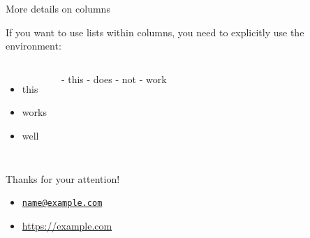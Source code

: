 \documentclass[10pt,aspectratio=169,]{beamer}
\begin{document}
\begin{frame}{More details on columns}
\label{more-details-on-columns}
\hypertarget{backup_column_details}{}

If you want to use lists within columns, you need to explicitly use the
 environment:

\begin{columns}[T,totalwidth=\textwidth]
\begin{itemize}
  \item this
  \item works
  \item well
\end{itemize}

\hfill

- this
- does
- not
- work
\end{columns}

\end{frame}

\begin{frame}[fragile]{}
  \vspace{0.5cm}

  \begin{center}
    {\Large Thanks for your attention!}
  \end{center}

  \vfill

  \begin{itemize}
    \item[{\protect\faEnvelope}] \href{mailto:name@example.com}{\nolinkurl{name@example.com}}
    \item[{\protect\faLaptop}] \url{https://example.com}
  \end{itemize}

\end{frame}
\end{document}
